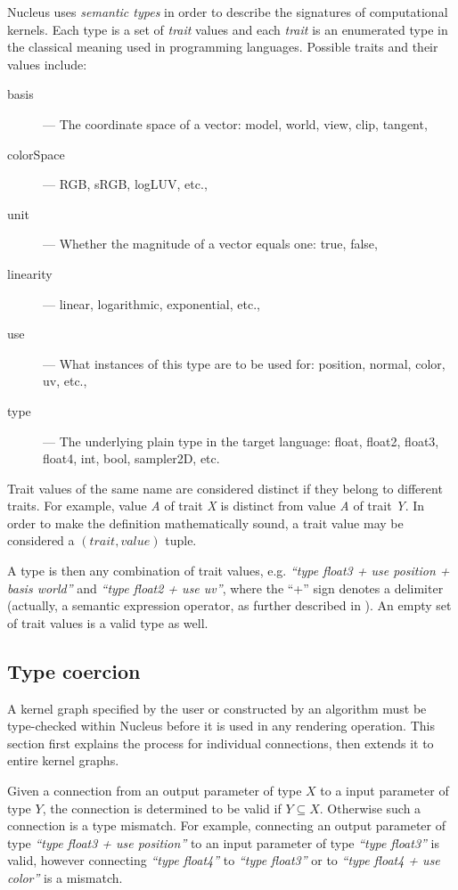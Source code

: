 Nucleus uses \emph{semantic types} in order to describe the signatures of computational kernels. Each type is a set of \emph{trait} values and each \emph{trait} is an enumerated type in the classical meaning used in programming languages. Possible traits and their values include:
\begin{description}
\item[basis] --- The coordinate space of a vector: model, world, view, clip, tangent,
\item[colorSpace] --- RGB, sRGB, logLUV, etc.,
\item[unit] --- Whether the magnitude of a vector equals one: true, false,
\item[linearity] --- linear, logarithmic, exponential, etc.,
\item[use] --- What instances of this type are to be used for: position, normal, color, uv, etc.,
\item[type] --- The underlying plain type in the target language: float, float2, float3, float4, int, bool, sampler2D, etc.
\end{description}

Trait values of the same name are considered distinct if they belong to different traits. For example, value \emph{A} of trait \emph{X} is distinct from value \emph{A} of trait \emph{Y}. In order to make the definition mathematically sound, a trait value may be considered a $(trait, value)$ tuple.

A type is then any combination of trait values, e.g. \emph{``type float3 + use position + basis world''} and \emph{``type float2 + use uv''}, where the ``+'' sign denotes a delimiter (actually, a semantic expression operator, as further described in ). An empty set of trait values is a valid type as well.

\subsection{Type coercion}
\label{sec:TypeCoercion}

A kernel graph specified by the user or constructed by an algorithm must be type-checked within Nucleus before it is used in any rendering operation. This section first explains the process for individual connections, then extends it to entire kernel graphs.

Given a connection from an output parameter of type $X$ to a input parameter of type $Y$, the connection is determined to be valid if $Y \subseteq X$. Otherwise such a connection is a type mismatch. For example, connecting an output parameter of type \emph{``type float3 + use position''} to an input parameter of type \emph{``type float3''} is valid, however connecting \emph{``type float4''} to \emph{``type float3''} or to \emph{``type float4 + use color''} is a mismatch.

